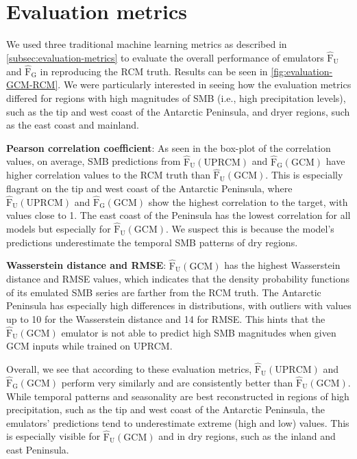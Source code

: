 \documentclass[a4paper,11pt,oneside]{report}
\begin{document}
\section{Evaluation metrics}
We used three traditional machine learning metrics as described in \autoref{subsec:evaluation-metrics} to evaluate the overall performance of emulators   $\mathrm{\hat{F}_{U}}$ and $\mathrm{\hat{F}_{G}}$ in reproducing the RCM truth. Results can be seen in \autoref{fig:evaluation-GCM-RCM}. We were particularly interested in seeing how the evaluation metrics differed for regions with high magnitudes of SMB (i.e., high precipitation levels), such as the tip and west coast of the Antarctic Peninsula, and dryer regions, such as the east coast and mainland. 

\textbf{Pearson correlation coefficient}: As seen in the box-plot of the correlation values, on average, SMB predictions from $\mathrm{\hat{F}_{U}(UPRCM)}$ and $\mathrm{\hat{F}_{G}(GCM)}$ have higher correlation values to the RCM truth than $\mathrm{\hat{F}_{U}(GCM)}$. This is especially flagrant on the tip and west coast of the Antarctic Peninsula, where $\mathrm{\hat{F}_{U}(UPRCM)}$ and $\mathrm{\hat{F}_{G}(GCM)}$ show the highest correlation to the target, with values close to 1. The east coast of the Peninsula has the lowest correlation for all models but especially for $\mathrm{\hat{F}_{U}(GCM)}$. We suspect this is because the model's predictions underestimate the temporal SMB patterns of dry regions. 

 \textbf{Wasserstein distance and RMSE}: $\mathrm{\hat{F}_{U}(GCM)}$ has the highest Wasserstein distance and RMSE values, which indicates that the density probability functions of its emulated SMB series are farther from the RCM truth. The Antarctic Peninsula has especially high differences in distributions, with outliers with values up to 10 for the Wasserstein distance and 14 for RMSE. This hints that the $\mathrm{\hat{F}_{U}(GCM)}$ emulator is not able to predict high SMB magnitudes when given GCM inputs while trained on UPRCM.   


Overall, we see that according to these evaluation metrics, $\mathrm{\hat{F}_{U}(UPRCM)}$ and $\mathrm{\hat{F}_{G}(GCM)}$ perform very similarly and are consistently better than $\mathrm{\hat{F}_{U}(GCM)}$. While temporal patterns and seasonality are best reconstructed in regions of high precipitation, such as the tip and west coast of the Antarctic Peninsula, the emulators' predictions tend to underestimate extreme (high and low) values. This is especially visible for $\mathrm{\hat{F}_{U}(GCM)}$ and in dry regions, such as the inland and east Peninsula. 
\end{document}
